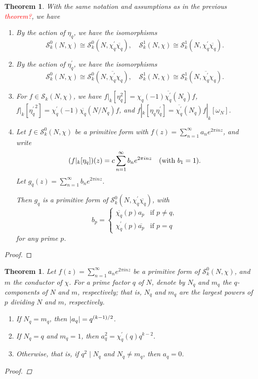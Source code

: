 \documentclass[10pt,leqno,twoside]{article}
\theoremstyle{plain}
\newtheorem{theorem}[lem]{Theorem}
\theoremstyle{definition}
\numberwithin{equation}{section}
\numberwithin{lem}{section}
\newcommand{\textib}[1]{\textbf{\textit{#1\index{#1}}}} %
\newcommand{\tbd}{{\Huge\color{red}{\textib{TBD}}}}
\newcommand{\sai}[1]{\textcolor{red}{#1}}
\begin{document}
\begin{theorem}\label{thm: miyake thm 4.6.16}
    With the same notation and assumptions as in the previous \sai{theorem?}, we have
    \begin{enumerate}[label=\textup{(\arabic*)}]
        \item By the action of $\eta_q$, we have the isomorphisms \[\mathcal S_k^0(N,\chi)\cong \mathcal S_k^0(N,\chi^\prime_q\overline{\chi_q}),\quad \mathcal S_k^1(N,\chi)\cong \mathcal S_k^1(N,\chi^\prime_q\overline{\chi_q}).\]
        \item By the action of $\eta^\prime_q$, we have the isomorphisms \[\mathcal S_k^0(N,\chi)\cong \mathcal S_k^0(N,\overline{\chi^\prime_q}\chi_q),\quad \mathcal S_k^1(N,\chi)\cong \mathcal S_k^1(N,\overline{\chi^\prime_q}\chi_q).\]
        \item For $f\in\mathcal S_k(N,\chi)$, we have $f|_k[\eta^2_q] = \chi_q(-1)\overline{\chi^\prime_q}(N_q)f$, $f|_k[{\eta^\prime_q}^2] = \chi^\prime_q(-1)\overline{\chi_q}(N/N_q)f$, and $f|_k[\eta_q\eta^\prime_q] = \overline{\chi^\prime_q}(N_q)f|_k[\omega_N]$.
        \item Let $f\in\mathcal S_k^0(N,\chi)$ be a primitive form with $f(z) = \sum_{n=1}^\infty a_ne^{2\pi i n z}$, and write \[(f|_k[\eta_q])(z) = c\sum_{n=1}^\infty b_ne^{2\pi i n z}\quad \text{\textup{(}with $b_1 = 1$\textup{)}}.\] Let $g_q(z) = \sum_{n=1}^\infty b_ne^{2\pi i n z}$.
        
        Then $g_q$ is a primitive form of $\mathcal S_k^0(N,\chi^\prime_q\overline{\chi_q})$, with \[b_p = \begin{cases}
            \overline{\chi_q}(p)a_p &\text{if $p\neq q$},\\
            \chi^\prime_q(p)\overline{a_p} & \text{if $p = q$}
        \end{cases}\] for any prime $p$.
    \end{enumerate}
\end{theorem}
\begin{proof}
    \tbd
\end{proof}
\begin{theorem}\label{thm: miyake thm 4.6.17}
    Let $f(z) = \sum_{n=1}^\infty a_ne^{2\pi i nz}$ be a primitive form of $\mathcal S_k^0(N,\chi)$, and $m$ the conductor of $\chi$. For a prime factor $q$ of $N$, denote by $N_q$ and $m_q$ the $q$-components of $N$ and $m$, respectively; that is, $N_q$ and $m_q$ are the largest powers of $p$ dividing $N$ and $m$, respectively. \begin{enumerate}[label=\textup{(\arabic*)}]
        \item If $N_q = m_q$, then $\abs{a_q} = q^{(k-1)/2}$.
        \item If $N_q = q$ and $m_q = 1$, then $a_q^2 = \chi^\prime_q(q)q^{k-2}$.
        \item Otherwise, that is, if $q^2\mid N_q$ and $N_q \neq m_q$, then $a_q = 0$.
    \end{enumerate}
    \begin{proof}
        \tbd
    \end{proof}
\end{theorem}
\end{document}
